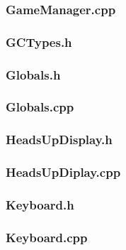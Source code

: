 \documentclass{article}
\begin{document}
\subsubsection{GameManager.cpp}
	
	 				
\subsubsection{GCTypes.h}
	
	 				
\subsubsection{Globals.h}
	 
	 				
\subsubsection{Globals.cpp}
	 
	 				
	 				
\subsubsection{HeadsUpDisplay.h}
	 
	 				
\subsubsection{HeadsUpDiplay.cpp}
	 		
	 				
\subsubsection{Keyboard.h}
	 
	 				
\subsubsection{Keyboard.cpp}
	 
	 				
\end{document}
